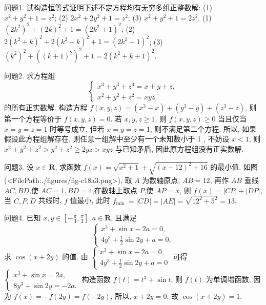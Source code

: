 
问题1. 试构造恒等式证明下述不定方程均有无穷多组正整数解:
(1) $x^2+y^2+1=z^2$;
(2) $2 x^2+2 y^2+1=z^2$;
(3) $x^2+y^2+1=2 z^2$.
(1) $\left(2 k^2\right)^2+(2 k)^2+1=\left(2 k^2+1\right)^2$;
(2) $2\left(k^2+k\right)^2+2\left(k^2-k\right)^2+1=\left(2 k^2+1\right)^2$;
(3) $\left(k^2\right)^2+\left((k+1)^2\right)^2+1=2\left(k^2+k+1\right)^2$.



问题2. 求方程组
$$
\left\{\begin{array}{l}
x^3+y^3+z^3=x+y+z, \\
x^2+y^2+z^2=x y z
\end{array}\right.
$$
的所有正实数解.
构造方程 $f(x, y, z)=\left(x^3-x\right)+\left(y^3-y\right)+\left(z^3-z\right)$, 则第一个方程等价于 $f(x, y, z)=0$.
若 $x, y, z \geqslant 1$, 则 $f(x, y, z) \geqslant 0$ 当且仅当 $x=y=z=1$ 时等号成立.
但若 $x=y=z=1$, 则不满足第二个方程.
所以, 如果假设此方程组解存在, 则任意一组解中至少有一个未知数小于 1 , 不妨设 $x<1$, 则 $x^2+y^2+z^2>y^2+z^2 \geqslant 2 y z>x y z$ 与已知矛盾, 因此原方程组没有正实数解.



问题3. 设 $x \in \mathbf{R}$, 求函数 $f(x)=\sqrt{x^2+1}+\sqrt{(x-12)^2+16}$ 的最小值.
如图(<FilePath:./figures/fig-c18a3.png>), 取 $A$ 为数轴原点, $A B=12$, 再作 $A B$ 垂线 $A C, B D$,使 $A C=1, B D=4$,在数轴上取点 $P$,使 $A P=x$, 则 $f(x)=|C P|+|D P|$, 当 $C, P, D$ 共线时, $f$ 值最小, 此时 $f_{\text {min }}=|C D|= |A E|=\sqrt{12^2+5^2}=13$.



问题4. 已知 $x, y \in\left[-\frac{\pi}{4}, \frac{\pi}{4}\right], a \in \mathbf{R}$, 且满足
$$
\left\{\begin{array}{l}
x^3+\sin x-2 a=0, \\
4 y^3+\frac{1}{2} \sin 2 y+a=0,
\end{array}\right.
$$
求 $\cos (x+2 y)$ 的值.
由 $\left\{\begin{array}{l}x^3+\sin x-2 a=0, \\ 4 y^3+\frac{1}{2} \sin 2 y+a=0\end{array}\right.$ 可得 $\left\{\begin{array}{l}x^3+\sin x=2 a, \\ 8 y^3+\sin 2 y=-2 a .\end{array}\right.$
构造函数 $f(t)=t^3+\sin t$, 则 $f(t)$ 为单调增函数, 因为 $f(x)= -f(2 y)=f(-2 y)$, 所以, $x+2 y=0$, 故 $\cos (x+2 y)=1$.



